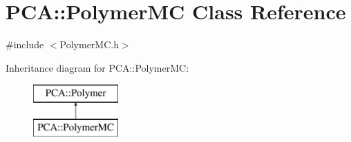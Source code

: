 \hypertarget{class_p_c_a_1_1_polymer_m_c}{}\section{P\+CA\+:\+:Polymer\+MC Class Reference}
\label{class_p_c_a_1_1_polymer_m_c}


{\ttfamily \#include $<$Polymer\+M\+C.\+h$>$}

Inheritance diagram for P\+CA\+:\+:Polymer\+MC\+:\begin{figure}[H]
\begin{center}
\leavevmode
\includegraphics[height=2.000000cm]{class_p_c_a_1_1_polymer_m_c}
\end{center}
\end{figure}
